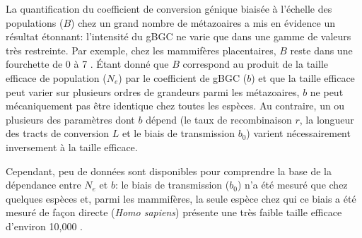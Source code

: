 {%
%
%








La quantification du coefficient de conversion génique biaisée à l'échelle des populations ($B$) chez un grand nombre de métazoaires \citep{galtier2018codon} a mis en évidence un résultat étonnant: 
l'intensité du gBGC ne varie que dans une gamme de valeurs très restreinte.
Par exemple, chez les mammifères placentaires, $B$ reste dans une fourchette de 0 à 7 \citep{lartillot2013phylogenetic}.
\'Etant donné que $B$ correspond au produit de la taille efficace de population ($N_e$) par le coefficient de gBGC ($b$) et que la taille efficace peut varier sur plusieurs ordres de grandeurs parmi les métazoaires, $b$ ne peut mécaniquement pas être identique chez toutes les espèces.
Au contraire, un ou plusieurs des paramètres dont $b$ dépend (le taux de recombinaison $r$, la longueur des tracts de conversion $L$ et le biais de transmission $b_0$) varient nécessairement inversement à la taille efficace.


Cependant, peu de données sont disponibles pour comprendre la base de la dépendance entre $N_e$ et $b$: le biais de transmission ($b_0$) n'a été mesuré que chez quelques espèces \citep{mancera2008highresolution, si2015widely, williams2015noncrossover, halldorsson2016rate, keith2016high, smeds2016highresolution} et, parmi les mammifères, la seule espèce chez qui ce biais a été mesuré de façon directe (\textit{Homo sapiens}) présente une très faible taille efficace d'environ 10,000 \citep{takahata1993allelic,erlich1996hla,harding1997archaic,charlesworth2009fundamental,yu2004nucleotide}.

}
